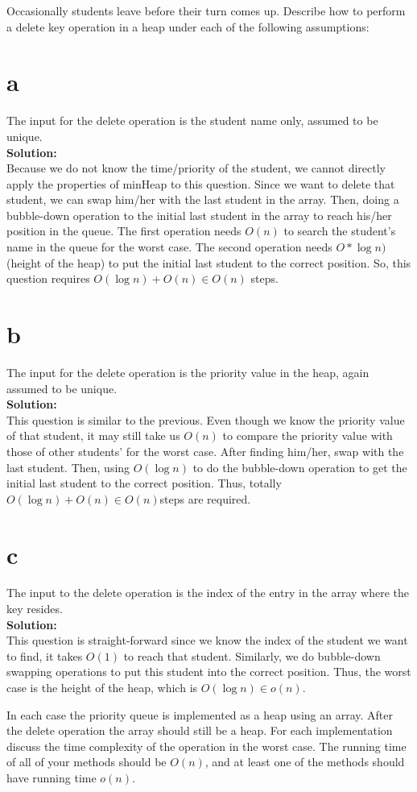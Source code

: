 \documentclass[12pt]{article}
\begin{document}
Occasionally students leave before their turn comes up.  Describe how
to perform a delete key operation in a heap under each of the following
assumptions:
\begin{enumerate}
\part{a} The input for the delete operation is the student name only,
assumed to be unique.
\\\textbf{Solution:}
\\Because we do not know the time/priority of the student, we cannot directly apply the properties of minHeap to this question. Since we want to delete that student, we can swap him/her with the last student in the array. Then, doing a bubble-down operation to the initial last student in the array to reach his/her position in the queue. The first operation needs $O(n)$ to search the student's name in the queue for the worst case. The second operation needs $O*\log{n})$ (height of the heap) to put the initial last student to the correct position. So, this question requires $O(\log{n}) + O(n) \in O(n)$ steps.
\part{b} The input for the delete operation is the priority
value in the heap, again assumed to be unique.
\\\textbf{Solution:}
\\This question is similar to the previous. Even though we know the priority value of that student, it may still take us $O(n)$ to compare the priority value with those of other students' for the worst case. After finding him/her, swap with the last student. Then, using $O(\log{n})$ to do the bubble-down operation to get the initial last student to the correct position. Thus, totally $O(\log{n}) + O(n) \in O(n)$steps are required. 
\part{c} The input to the delete operation is the index
 of the entry in the array where the key resides.
\\\textbf{Solution:}
\\This question is straight-forward since we know the index of the student we want to find, it takes $O(1)$ to reach that student. Similarly, we do bubble-down swapping operations to put this student into the correct position. Thus, the worst case is the height of the heap, which is $O(\log{n}) \in o(n)$. 
\end{enumerate}
In each case the priority queue is implemented as a heap using an
array. After the delete operation the array should still be a heap.
For each implementation discuss the time complexity of the operation in
the worst case.  The running time of all of your methods should be $O(n)$, and
at least one of the methods should have running time $o(n)$.
\end{document}
